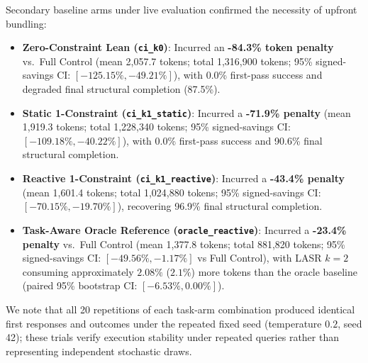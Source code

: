 Secondary baseline arms under live evaluation confirmed the necessity of upfront bundling:
\begin{itemize}
    \item \textbf{Zero-Constraint Lean (\texttt{ci\_k0})}: Incurred an \textbf{-84.3\% token penalty} vs.\ Full Control (mean 2,057.7 tokens; total 1,316,900 tokens; 95\% signed-savings CI: $[-125.15\%, -49.21\%]$), with 0.0\% first-pass success and degraded final structural completion (87.5\%).
    \item \textbf{Static 1-Constraint (\texttt{ci\_k1\_static})}: Incurred a \textbf{-71.9\% penalty} (mean 1,919.3 tokens; total 1,228,340 tokens; 95\% signed-savings CI: $[-109.18\%, -40.22\%]$), with 0.0\% first-pass success and 90.6\% final structural completion.
    \item \textbf{Reactive 1-Constraint (\texttt{ci\_k1\_reactive})}: Incurred a \textbf{-43.4\% penalty} (mean 1,601.4 tokens; total 1,024,880 tokens; 95\% signed-savings CI: $[-70.15\%, -19.70\%]$), recovering 96.9\% final structural completion.
    \item \textbf{Task-Aware Oracle Reference (\texttt{oracle\_reactive})}: Incurred a \textbf{-23.4\% penalty} vs.\ Full Control (mean 1,377.8 tokens; total 881,820 tokens; 95\% signed-savings CI: $[-49.56\%, -1.17\%]$ vs Full Control), with LASR $k=2$ consuming approximately $2.08\%$ ($2.1\%$) more tokens than the oracle baseline (paired 95\% bootstrap CI: $[-6.53\%, 0.00\%]$).
\end{itemize}

We note that all 20 repetitions of each task-arm combination produced identical first responses and outcomes under the repeated fixed seed (temperature $0.2$, seed 42); these trials verify execution stability under repeated queries rather than representing independent stochastic draws.


